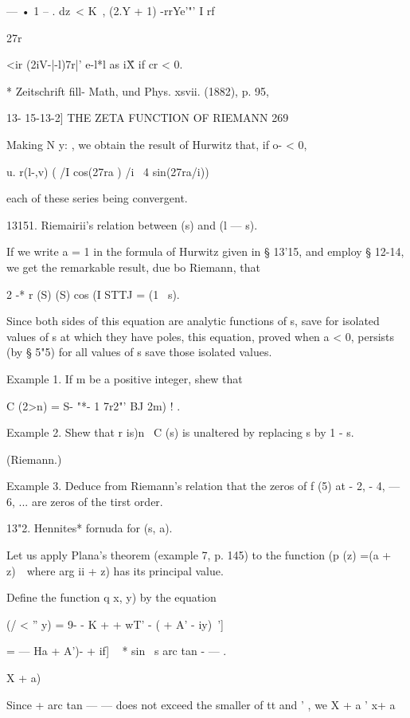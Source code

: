 — • 1 -- . dz\ <  K\ ,  (2.Y + 1) -rrYe'"' I rf  



27r  



<ir (2iV-|-l)7r|' e-l*l 
  as i\"   X if cr < 0. 

* Zeitschrift fill- Math, und Phys. xsvii. (1882), p. 95, 



13- 15-13-2] THE ZETA FUNCTION OF RIEMANN 269 

Making N   y: , we obtain the result of Hurwitz that, if o- < 0, 

 u.   r(l-,v) ( /I    cos(27ra ) /i \ 4 sin(27ra/i)) 

each of these series being convergent. 

13151. Riemairii's relation between  (s) and  (l — s). 

If we write a = 1 in the formula of Hurwitz given in § 13'15, and employ 
§ 12-14, we get the remarkable result, due bo Riemann, that 

2 -* r (S) (S) cos (I STTJ =   (1 \  s). 

Since both sides of this equation are analytic functions of s, save for isolated 
values of s at which they have poles, this equation, proved when a < 0, 
persists (by § 5"5) for all values of s save those isolated values. 

Example 1. If m be a positive integer, shew that 

C (2>n) = S- "*- 1 7r2"' BJ 2m) ! . 

Example 2. Shew that r  is)n~  C (s) is unaltered by replacing s by 1 - s. 

(Riemann.) 

Example 3. Deduce from Riemann's relation that the zeros of f (5) at - 2, - 4, — 6, ... 
are zeros of the tirst order. 

13"2. Hennites* fornuda for  (s, a). 

Let us apply Plana's theorem (example 7, p. 145) to the function 
(p (z) =(a + z)~\ where arg  ii + z) has its principal value. 

Define the function q  x, y) by the equation 

(/ < '' y) = 9- - K  +   + wT' - (  + A' - iy)~'] 

= — Ha + A')- + if] ~  * sin \ s arc tan - —    . 

  X + a) 

Since + arc tan — — does not exceed the smaller of  tt and '  , we 
X + a ' x+ a 




